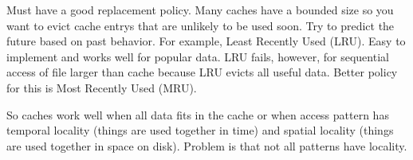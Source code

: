 \documentclass[psamsfonts]{amsart}
\begin{document}
Must have a good replacement policy. Many caches have a bounded size so you want to evict cache entrys that are unlikely to be used soon. Try to predict the future based on past behavior. For example, Least Recently Used (LRU). Easy to implement and works well for popular data. LRU fails, however, for sequential access of file larger than cache because LRU evicts all useful data. Better policy for this is Most Recently Used (MRU).

So caches work well when all data fits in the cache or when access pattern has temporal locality (things are used together in time) and spatial locality (things are used together in space on disk). Problem is that not all patterns have locality.
\end{document}
